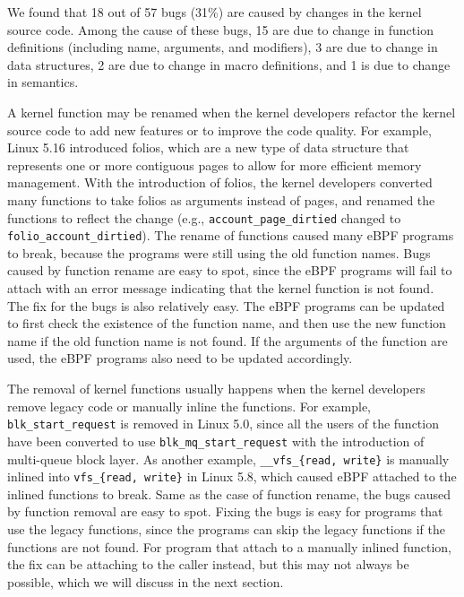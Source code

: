 We found that 18 out of 57 bugs (31\%) are caused by changes in the kernel source code.
Among the cause of these bugs, 15 are due to change in function definitions (including name, arguments, and modifiers), 3 are due to change in data structures, 2 are due to change in macro definitions, and 1 is due to change in semantics. 

A kernel function may be renamed when the kernel developers refactor the kernel source code to add new features or to improve the code quality.
For example, Linux 5.16 introduced folios, which are a new type of data structure that represents one or more contiguous pages to allow for more efficient memory management.
With the introduction of folios, the kernel developers converted many functions to take folios as arguments instead of pages, and renamed the functions to reflect the change (e.g., \texttt{account\_page\_dirtied} changed to \texttt{folio\_account\_dirtied}).
The rename of functions caused many eBPF programs to break, because the programs were still using the old function names.
Bugs caused by function rename are easy to spot, since the eBPF programs will fail to attach with an error message indicating that the kernel function is not found. 
The fix for the bugs is also relatively easy. The eBPF programs can be updated to first check the existence of the function name, and then use the new function name if the old function name is not found. 
If the arguments of the function are used, the eBPF programs also need to be updated accordingly.

The removal of kernel functions usually happens when the kernel developers remove legacy code or manually inline the functions.
For example, \texttt{blk\_start\_request} is removed in Linux 5.0, since all the users of the function have been converted to use \texttt{blk\_mq\_start\_request} with the introduction of multi-queue block layer.
As another example, \texttt{\_\_vfs\_\{read, write\}} is manually inlined into \texttt{vfs\_\{read, write\}} in Linux 5.8, which caused eBPF attached to the inlined functions to break.
Same as the case of function rename, the bugs caused by function removal are easy to spot. 
Fixing the bugs is easy for programs that use the legacy functions, since the programs can skip the legacy functions if the functions are not found.
For program that attach to a manually inlined function, the fix can be attaching to the caller instead, but this may not always be possible, which we will discuss in the next section.

